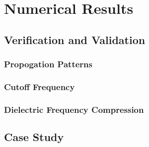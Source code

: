 \section{Numerical Results}
\label{sec:numres} 

\subsection{Verification and Validation}
\label{subsec:vv}

\subsubsection{Propogation Patterns}
\label{subsubsec:prop_pat}

\subsubsection{Cutoff Frequency}
\label{subsubsec:cut_freq}

\subsubsection{Dielectric Frequency Compression}
\label{subsubsec:cut_freq}

\subsection{Case Study}